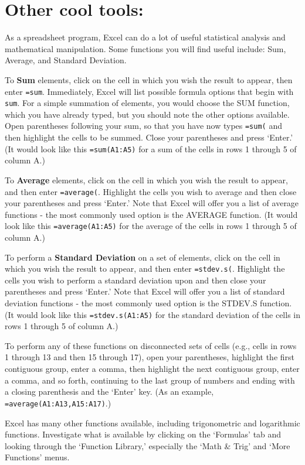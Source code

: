\newpage

\section*{Other cool tools:}
As a spreadsheet program, Excel can do a lot of useful statistical analysis and mathematical manipulation. 
Some functions you will find useful include: Sum, Average, and Standard Deviation.
\par 
To \textbf{Sum} elements, click on the cell in which you wish the result to appear, then enter \texttt{=sum}. 
Immediately, Excel will list possible formula options that begin with \texttt{sum}. 
For a simple summation of elements, you would choose the SUM function, which you have already typed, but you should note the other options available. 
Open parentheses following your sum, so that you have now types \texttt{=sum(} and then highlight the cells to be summed. 
Close your parentheses and press `Enter.' 
(It would look like this \texttt{=sum(A1:A5)} for a sum of the cells in rows 1 through 5 of column A.)
\par 
To \textbf{Average} elements, click on the cell in which you wish the result to appear, and then enter \texttt{=average(}. Highlight the cells you wish to average and then close your parentheses and press `Enter.' 
Note that Excel will offer you a list of average functions - the most commonly used option is the AVERAGE function. (It would look like this \texttt{=average(A1:A5)} for the average of the cells in rows 1 through 5 of column A.)
\par 
To perform a \textbf{Standard Deviation} on a set of elements, click on the cell in which you wish the result to appear, and then enter \texttt{=stdev.s(}. 
Highlight the cells you wish to perform a standard deviation upon and then close your parentheses and press `Enter.' 
Note that Excel will offer you a list of standard deviation functions - the most commonly used option is the STDEV.S function. 
(It would look like this \texttt{=stdev.s(A1:A5)} for the standard deviation of the cells in rows 1 through 5 of column A.)
\par 
To perform any of these functions on disconnected sets of cells (e.g., cells in rows 1 through 13 and then 15 through 17), open your parentheses, highlight the first contiguous group, enter a comma, then highlight the next contiguous group, enter a comma, and so forth, continuing to the last group of numbers and ending with a closing parenthesis and the `Enter' key. 
(As an example, \texttt{=average(A1:A13,A15:A17)}.)
\par 
Excel has many other functions available, including trigonometric and logarithmic functions. 
Investigate what is available by clicking on the `Formulas' tab and looking through the `Function Library,' especially the `Math \& Trig' and `More Functions' menus.

